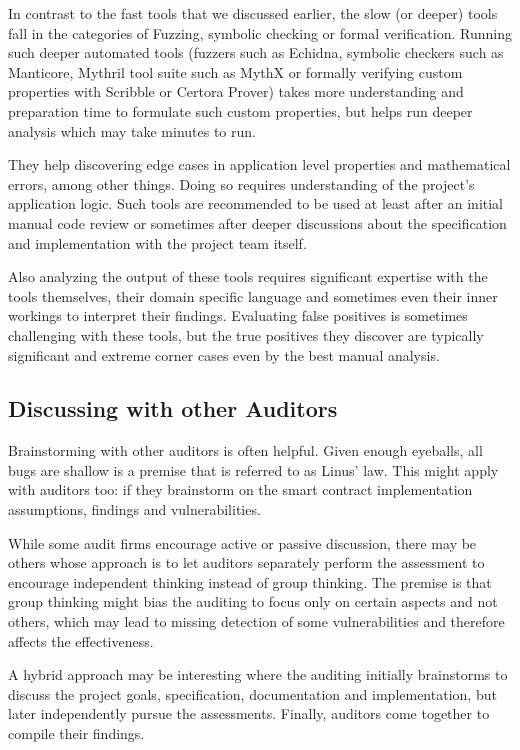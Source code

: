 In contrast to the fast tools that we discussed earlier, the slow (or
deeper) tools fall in the categories of Fuzzing, symbolic checking or
formal verification. Running such deeper automated tools (fuzzers such
as Echidna, symbolic checkers such as Manticore, Mythril tool suite such
as MythX or formally verifying custom properties with Scribble or
Certora Prover) takes more understanding and preparation time to
formulate such custom properties, but helps run deeper analysis which
may take minutes to run.

They help discovering edge cases in application level properties and
mathematical errors, among other things. Doing so requires understanding
of the project's application logic. Such tools are recommended to be
used at least after an initial manual code review or sometimes after
deeper discussions about the specification and implementation with the
project team itself.

Also analyzing the output of these tools requires significant expertise
with the tools themselves, their domain specific language and sometimes
even their inner workings to interpret their findings. Evaluating false
positives is sometimes challenging with these tools, but the true
positives they discover are typically significant and extreme corner
cases even by the best manual analysis.

\subsection{Discussing with other
Auditors}\label{discussing-with-other-auditors}

Brainstorming with other auditors is often helpful. Given enough
eyeballs, all bugs are shallow is a premise that is referred to as
Linus' law. This might apply with auditors too: if they brainstorm on
the smart contract implementation assumptions, findings and
vulnerabilities.

While some audit firms encourage active or passive discussion, there may
be others whose approach is to let auditors separately perform the
assessment to encourage independent thinking instead of group thinking.
The premise is that group thinking might bias the auditing to focus only
on certain aspects and not others, which may lead to missing detection
of some vulnerabilities and therefore affects the effectiveness.

A hybrid approach may be interesting where the auditing initially
brainstorms to discuss the project goals, specification, documentation
and implementation, but later independently pursue the assessments.
Finally, auditors come together to compile their findings.

